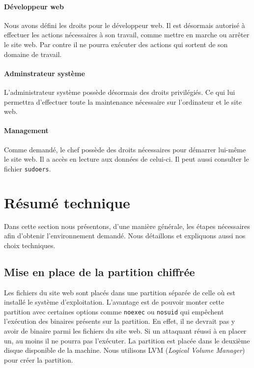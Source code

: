 \documentclass{extarticle} %
\begin{document}
    \paragraph{Développeur web} Nous avons défini les droits pour le développeur web.
    Il est désormais autorisé à effectuer les actions nécessaires à son travail, comme mettre 
    en marche ou arrêter le site web. Par contre il ne pourra exécuter des actions qui sortent
    de son domaine de travail.


    \paragraph{Adminstrateur système} L'administrateur système possède désormais des droits privilégiés. Ce qui lui
    permettra d'effectuer toute la maintenance nécessaire sur l'ordinateur et le site web.

    \paragraph{Management} Comme demandé, le chef possède des droits nécessaires pour
     démarrer lui-même le site web. Il a accès en lecture aux données de celui-ci. 
     Il peut aussi consulter le fichier \texttt{sudoers}.

     \section{Résumé technique}

     Dans cette section nous présentons, d'une manière générale, les étapes nécessaires afin d'obtenir l'environnement demandé. Nous détaillons et expliquons aussi nos choix techniques.

     \subsection{Mise en place de la partition chiffrée}

     Les fichiers du site web sont placés dans une partition séparée de celle où est installé le système d'exploitation. 
     L'avantage est de pouvoir monter cette partition avec certaines options comme \texttt{noexec} ou \texttt{nosuid} 
     qui empêchent l'exécution des binaires présents sur la partition. En effet, il ne devrait pas y avoir de binaire
      parmi les fichiers du site web. Si un attaquant réussi à en placer un, au moins il ne pourra pas l'exécuter. La 
      partition est placée dans le deuxième disque disponible de la machine. Nous utilisons LVM (\textit{Logical Volume Manager})
       pour créer la partition.
\end{document}
